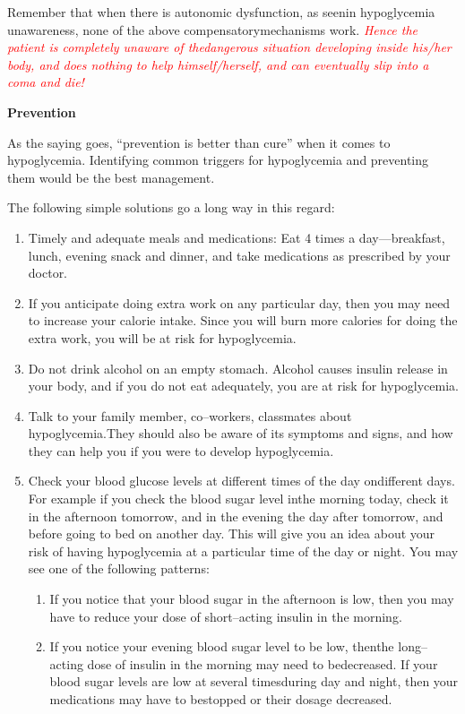 Remember that when there is autonomic dysfunction, as seen\break in hypoglycemia unawareness, none of the above compensatory\break mecha\-nisms work. \textcolor{red}{\textit{Hence the patient is completely unaware of the\break dangerous situation developing inside his/her body, and does nothing to help himself/herself, and can eventually slip into a coma and die!}}

\vskip 6pt


\noindent\textbf{Prevention}

As the saying goes, “prevention is better than cure” when it comes to hypoglycemia. Identifying common triggers for hypoglycemia and preventing them would be the best management.

\noindent The following simple solutions go a long way in this regard:

\vspace{-\topsep}
\begin{enumerate}[•]
\itemsep=0pt
\item Timely and adequate meals and medications: Eat 4 times a day—breakfast, lunch, evening snack and dinner, and take medications as prescribed by your doctor.
 \item If you anticipate doing extra work on any particular day, then you may need to increase your calorie intake. Since you will burn more calories for doing the extra work, you will be at risk for hypoglycemia.
 \item Do not drink alcohol on an empty stomach. Alcohol causes insulin release in your body, and if you do not eat adequately, you are at risk for hypoglycemia.
 \item Talk to your family member, co–workers, classmates about hypoglycemia.They should also be aware of its symptoms and signs, and how they can help you if you were to develop hypoglycemia.
 \item Check your blood glucose levels at different times of the day on\break diffe\-rent days. For example if you check the blood sugar level in\break the morning today, check it in the afternoon tomorrow, and in the eve\-ning the day after tomorrow, and before going to bed on another day. This will give you an idea about your risk of having hypogly\-cemia at a particular time of the day or night. You may see one of the following patterns:
 \begin{enumerate}[o]
\itemsep=0pt
 \item If you notice that your blood sugar in the afternoon is low, then you may have to reduce your dose of short–acting insulin in the morning.
 \item If you notice your evening blood sugar level to be low, then\break the long–acting dose of insulin in the morning may need to be\break decreased. If your blood sugar levels are low at several times\break during day and night, then your medications may have to be\break stopped or their dosage decreased.
\end{enumerate}
\end{enumerate}

